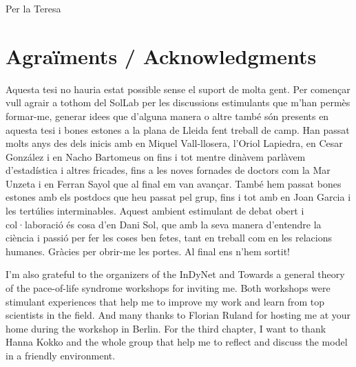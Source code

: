 \documentclass[12pt,a4paper,twoside,fleqn]{memoir}
\begin{document}

\vspace*{.4\textheight}

\begin{flushright}
Per la Teresa
\end{flushright}


\cleardoublepage %

\section*{Agraïments / Acknowledgments}

Aquesta tesi no hauria estat possible sense el suport de molta gent. Per
començar vull agrair a tothom del SolLab per les discussions estimulants que
m'han permès formar-me, generar idees que d'alguna manera o altre també són
presents en aquesta tesi i bones estones a la plana de Lleida fent treball de
camp. Han passat molts anys des dels inicis amb en Miquel Vall-llosera, l'Oriol
Lapiedra, en Cesar González i en Nacho Bartomeus on fins i tot mentre dinàvem
parlàvem d'estadística i altres fricades, fins a les noves fornades de doctors
com la Mar Unzeta i en Ferran Sayol que al final em van avançar. També hem
passat bones estones amb els postdocs que heu passat pel grup, fins i tot amb en
Joan Garcia i les tertúlies interminables.
Aquest ambient estimulant de debat obert i col·laboració és cosa d'en Dani Sol,
que amb la seva manera d'entendre la ciència i passió per fer les coses ben
fetes, tant en treball com en les relacions humanes. Gràcies per obrir-me les
portes. Al final ens n'hem sortit!

I'm also grateful to the organizers of the InDyNet and Towards a general theory
of the pace-of-life syndrome workshops for inviting me. Both workshops were
stimulant experiences that help me to improve my work and learn from top
scientists in the field. And many thanks to Florian Ruland for hosting me at
your home during the workshop in Berlin. For the third chapter, I want to thank
Hanna Kokko and the whole group that help me to reflect and discuss the model in
a friendly environment.
\end{document}
